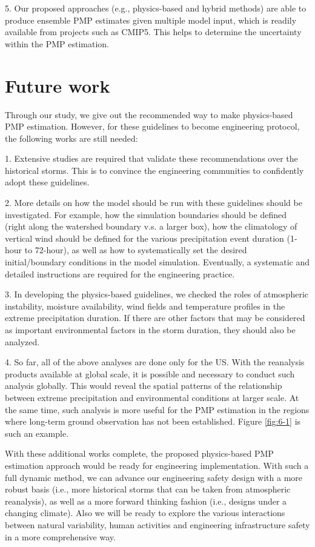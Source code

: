 5. Our proposed approaches (e.g., physics-based and hybrid methods) are able to produce ensemble PMP estimates given multiple model input, which is readily available from projects such as CMIP5. This helps to determine the uncertainty within the PMP estimation.

\section{Future work}
Through our study, we give out the recommended way to make physics-based PMP estimation. However, for these guidelines to become engineering protocol, the following works are still needed:

1. Extensive studies are required that validate these recommendations over the historical storms. This is to convince the engineering communities to confidently adopt these guidelines.

2. More details on how the model should be run with these guidelines should be investigated. For example, how the simulation boundaries should be defined (right along the watershed boundary v.s. a larger box), how the climatology of vertical wind should be defined for the various precipitation event duration (1-hour to 72-hour), as well as how to systematically set the desired initial/boundary conditions in the model simulation. Eventually, a systematic and detailed instructions are required for the engineering practice.

3. In developing the physics-based guidelines, we checked the roles of atmospheric instability, moisture availability, wind fields and temperature profiles in the extreme precipitation duration. If there are other factors that may be considered as important environmental factors in the storm duration, they should also be analyzed.

4. So far, all of the above analyses are done only for the US. With the reanalysis products available at global scale, it is possible and necessary to conduct such analysis globally. This would reveal the spatial patterns of the relationship between extreme precipitation and environmental conditions at larger scale. At the same time, such analysis is more useful for the PMP estimation in the regions where long-term ground observation has not been established. Figure \ref{fig:6-1} is such an example.

With these additional works complete, the proposed physics-based PMP estimation approach would be ready for engineering implementation. With such a full dynamic method, we can advance our engineering safety design with a more robust basis (i.e., more historical storms that can be taken from atmospheric reanalysis), as well as a more forward thinking fashion (i.e., designs under a changing climate). Also we will be ready to explore the various interactions between natural variability, human activities and engineering infrastructure safety in a more comprehensive way.

